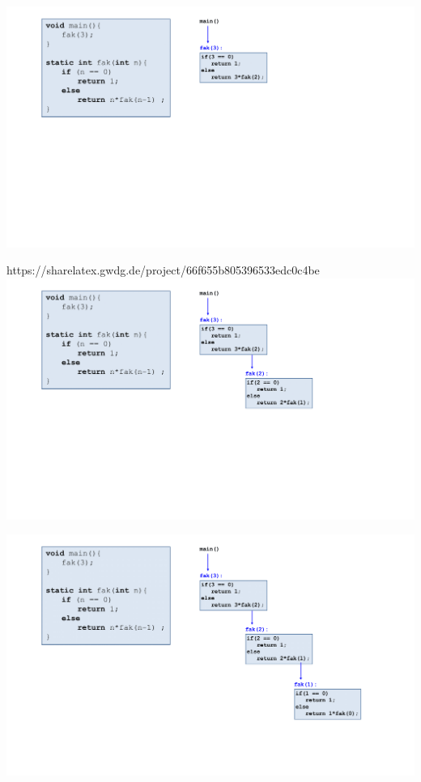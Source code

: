 \documentclass{beamer}
\begin{document}
\begin{frame}
    \begin{center}
           \includegraphics[width=1.1\textwidth]{rekursion anlage/07_Rekursion-04.png}
    \end{center}
\end{frame}
\begin{frame}
    \begin{center}https://sharelatex.gwdg.de/project/66f655b805396533edc0c4be
           \includegraphics[width=1.1\textwidth]{rekursion anlage/07_Rekursion-05.png}
    \end{center}
\end{frame}
\begin{frame}
    \begin{center}
           \includegraphics[width=1.1\textwidth]{rekursion anlage/07_Rekursion-06.png}
    \end{center}
\end{frame}
\end{document}
